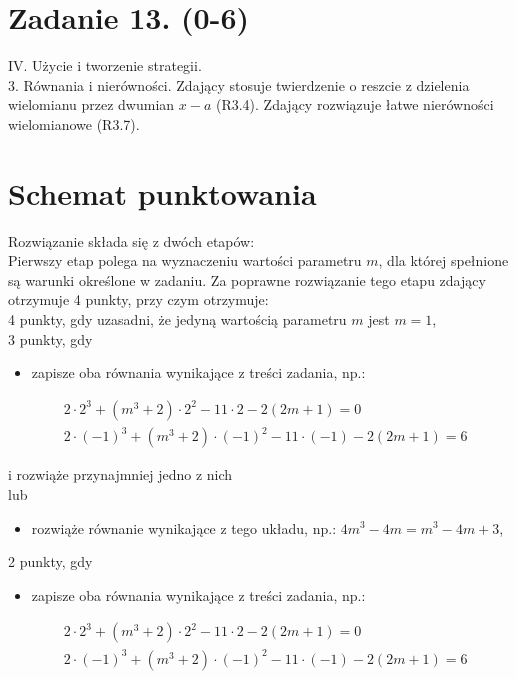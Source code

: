 \documentclass[10pt]{article}
\begin{document}
\section*{Zadanie 13. (0-6)}
IV. Użycie i tworzenie strategii.\\
3. Równania i nierówności. Zdający stosuje twierdzenie o reszcie z dzielenia wielomianu przez dwumian $x-a$ (R3.4). Zdający rozwiązuje łatwe nierówności wielomianowe (R3.7).

\section*{Schemat punktowania}
Rozwiązanie składa się z dwóch etapów:\\
Pierwszy etap polega na wyznaczeniu wartości parametru $m$, dla której spełnione są warunki określone w zadaniu. Za poprawne rozwiązanie tego etapu zdający otrzymuje 4 punkty, przy czym otrzymuje:\\
4 punkty, gdy uzasadni, że jedyną wartością parametru $m$ jest $m=1$,\\
3 punkty, gdy

\begin{itemize}
  \item zapisze oba równania wynikające z treści zadania, np.:
\end{itemize}

$$
\begin{aligned}
& 2 \cdot 2^{3}+\left(m^{3}+2\right) \cdot 2^{2}-11 \cdot 2-2(2 m+1)=0 \\
& 2 \cdot(-1)^{3}+\left(m^{3}+2\right) \cdot(-1)^{2}-11 \cdot(-1)-2(2 m+1)=6
\end{aligned}
$$

i rozwiąże przynajmniej jedno z nich\\
lub

\begin{itemize}
  \item rozwiąże równanie wynikające z tego układu, np.: $4 m^{3}-4 m=m^{3}-4 m+3$,
\end{itemize}

2 punkty, gdy

\begin{itemize}
  \item zapisze oba równania wynikające z treści zadania, np.:
\end{itemize}

$$
\begin{aligned}
& 2 \cdot 2^{3}+\left(m^{3}+2\right) \cdot 2^{2}-11 \cdot 2-2(2 m+1)=0 \\
& 2 \cdot(-1)^{3}+\left(m^{3}+2\right) \cdot(-1)^{2}-11 \cdot(-1)-2(2 m+1)=6
\end{aligned}
$$
\end{document}
